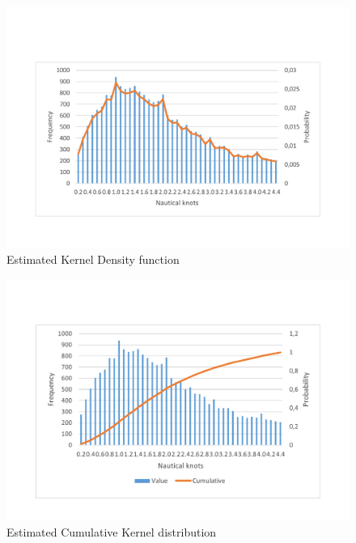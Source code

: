\begin{enumerate}
\end{enumerate} 







\begin{figure}[H]
    \centering
    \includegraphics[trim=0 80 0 80,height=0.45\linewidth]{Chapters/img/hist_kernel.pdf}
    \caption{Estimated Kernel Density function}
    \label{fig:app_b_6}
\end{figure}


\begin{figure}[H]
    \centering
    \includegraphics[trim=0 80 0 80,height=0.45\linewidth]{Chapters/img/hist_comulative.pdf}
    \caption{Estimated Cumulative Kernel distribution}
    \label{fig:app_b_7}
\end{figure}


